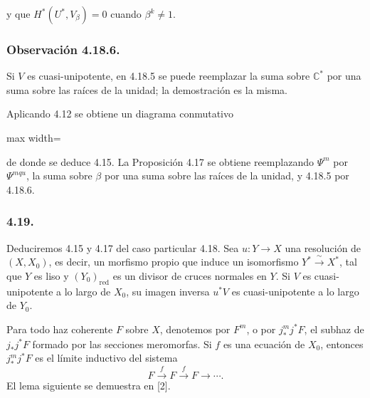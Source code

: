 \pageoriginale

y que $H^*(U^*,V_\beta)=0$ cuando $\beta^k\ne1$.

\subsubsection*{Observación 4.18.6.}
Si $V$ es cuasi-unipotente, en 4.18.5 se puede reemplazar la suma sobre
$\mathbb C^*$ por una suma sobre las raíces de la unidad; la demostración
es la misma.

Aplicando 4.12 se obtiene un diagrama conmutativo
\begin{center}
\begin{adjustbox}{max width=\linewidth}\end{adjustbox}
\end{center}
de donde se deduce 4.15. La Proposición 4.17 se obtiene reemplazando
$\Psi^m$ por $\Psi^{mqu}$, la suma sobre $\beta$ por una suma sobre las
raíces de la unidad, y 4.18.5 por 4.18.6.

\subsubsection*{4.19.}
Deduciremos 4.15 y 4.17 del caso particular 4.18. Sea
$u:Y\longrightarrow X$ una resolución de $(X,X_0)$, es decir, un
morfismo propio que induce un isomorfismo
$Y^*\xrightarrow{\ \sim\ }X^*$, tal que $Y$ es liso y
$(Y_0)_{\mathrm{red}}$ es un divisor de cruces normales en $Y$. Si $V$
es cuasi-unipotente a lo largo de $X_0$, su imagen inversa $u^*V$ es
cuasi-unipotente a lo largo de $Y_0$.

Para todo haz coherente $F$ sobre $X$, denotemos por $F^m$, o por
$j_*^m j^*F$, el subhaz de $j_*j^*F$ formado por las secciones
meromorfas. Si $f$ es una ecuación de $X_0$, entonces $j_*^m j^*F$ es
el límite inductivo del sistema
\begin{equation}\tag{4.19.1}
F\xrightarrow{f}F\xrightarrow{f}F\longrightarrow\cdots.
\end{equation}
El lema siguiente se demuestra en [2].

